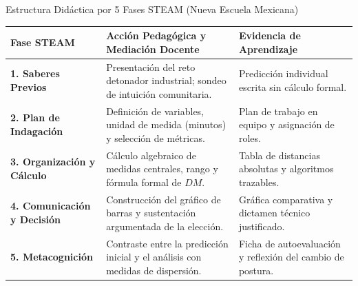 \documentclass[
	spanish,
	aspectratio=169,
	xcolor={dvipsnames,table}
]{beamer}
\begin{document}
\begin{frame}{Estructura Didáctica por 5 Fases STEAM (Nueva Escuela Mexicana)}
\footnotesize
\renewcommand{\arraystretch}{1.2}
\begin{tabularx}{\linewidth}{p{2.3cm}|X|p{4.2cm}}
\toprule
\rowcolor{iiiepePale} \textbf{Fase STEAM} & \textbf{Acción Pedagógica y Mediación Docente} & \textbf{Evidencia de Aprendizaje} \\
\midrule
\textbf{1. Saberes Previos} & Presentación del reto detonador industrial; sondeo de intuición comunitaria. & Predicción individual escrita sin cálculo formal. \\
\textbf{2. Plan de Indagación} & Definición de variables, unidad de medida (minutos) y selección de métricas. & Plan de trabajo en equipo y asignación de roles. \\
\textbf{3. Organización y Cálculo} & Cálculo algebraico de medidas centrales, rango y fórmula formal de $DM$. & Tabla de distancias absolutas y algoritmos trazables. \\
\textbf{4. Comunicación y Decisión} & Construcción del gráfico de barras y sustentación argumentada de la elección. & Gráfica comparativa y dictamen técnico justificado. \\
\textbf{5. Metacognición} & Contraste entre la predicción inicial y el análisis con medidas de dispersión. & Ficha de autoevaluación y reflexión del cambio de postura. \\
\bottomrule
\end{tabularx}
\end{frame}
\end{document}
